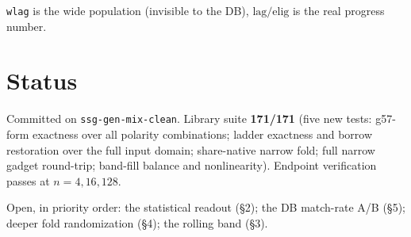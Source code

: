 \documentclass[11pt]{article}
\begin{document}
\texttt{wlag} is the wide population (invisible to the DB),
$\mathrm{lag}/\mathrm{elig}$ is the real progress number.

\section{Status}

Committed on \texttt{ssg-gen-mix-clean}. Library suite \textbf{171/171} (five new
tests: g57-form exactness over all polarity combinations; ladder exactness and
borrow restoration over the full input domain; share-native narrow fold; full
narrow gadget round-trip; band-fill balance and nonlinearity). Endpoint
verification passes at $n=4,16,128$.

Open, in priority order: the statistical readout (\S2); the DB match-rate A/B
(\S5); deeper fold randomization (\S4); the rolling band (\S3).
\end{document}
